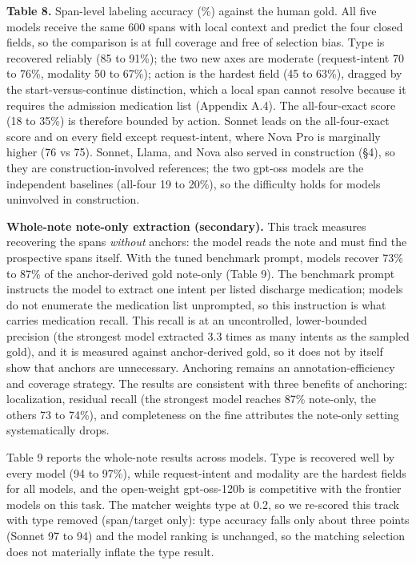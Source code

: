 \textbf{Table 8.} Span-level labeling accuracy (\%) against the human gold. All five models receive the same 600 spans with local context and predict the four closed fields, so the comparison is at full coverage and free of selection bias. Type is recovered reliably (85 to 91\%); the two new axes are moderate (request-intent 70 to 76\%, modality 50 to 67\%); action is the hardest field (45 to 63\%), dragged by the start-versus-continue distinction, which a local span cannot resolve because it requires the admission medication list (Appendix A.4). The all-four-exact score (18 to 35\%) is therefore bounded by action. Sonnet leads on the all-four-exact score and on every field except request-intent, where Nova Pro is marginally higher (76 vs 75). Sonnet, Llama, and Nova also served in construction (§4), so they are construction-involved references; the two gpt-oss models are the independent baselines (all-four 19 to 20\%), so the difficulty holds for models uninvolved in construction.

\textbf{Whole-note note-only extraction (secondary).} This track measures recovering the spans \emph{without} anchors: the model reads the note and must find the prospective spans itself. With the tuned benchmark prompt, models recover 73\% to 87\% of the anchor-derived gold note-only (Table 9). The benchmark prompt instructs the model to extract one intent per listed discharge medication; models do not enumerate the medication list unprompted, so this instruction is what carries medication recall. This recall is at an uncontrolled, lower-bounded precision (the strongest model extracted 3.3 times as many intents as the sampled gold), and it is measured against anchor-derived gold, so it does not by itself show that anchors are unnecessary. Anchoring remains an annotation-efficiency and coverage strategy. The results are consistent with three benefits of anchoring: localization, residual recall (the strongest model reaches 87\% note-only, the others 73 to 74\%), and completeness on the fine attributes the note-only setting systematically drops.

Table 9 reports the whole-note results across models. Type is recovered well by every model (94 to 97\%), while request-intent and modality are the hardest fields for all models, and the open-weight gpt-oss-120b is competitive with the frontier models on this task. The matcher weights type at 0.2, so we re-scored this track with type removed (span/target only): type accuracy falls only about three points (Sonnet 97 to 94) and the model ranking is unchanged, so the matching selection does not materially inflate the type result.

